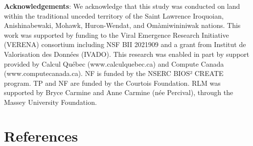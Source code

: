 \documentclass[11pt]{article}
\begin{document}
\textbf{Acknowledgements}: We acknowledge that this study was conducted
on land within the traditional unceded territory of the Saint Lawrence
Iroquoian, Anishinabewaki, Mohawk, Huron-Wendat, and Omàmiwininiwak
nations. This work was supported by funding to the Viral Emergence
Research Initiative (VERENA) consortium including NSF BII 2021909 and a
grant from Institut de Valorisation des Données (IVADO). This research
was enabled in part by support provided by Calcul Québec
(www.calculquebec.ca) and Compute Canada (www.computecanada.ca). NF is
funded by the NSERC BIOS² CREATE program. TP and NF are funded by the
Courtois Foundation. RLM was supported by Bryce Carmine and Anne Carmine
(née Percival), through the Massey University Foundation.

\hypertarget{references}{%
\section*{References}\label{references}}
\end{document}
